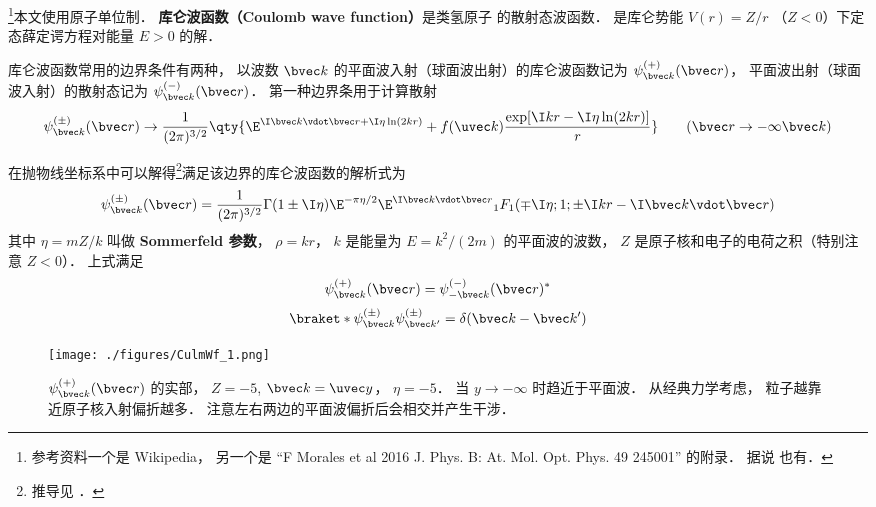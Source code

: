 

\footnote{参考资料一个是 Wikipedia， 另一个是 “F Morales et al 2016 J. Phys. B: At. Mol. Opt. Phys. 49 245001” 的附录． 据说 \cite{Merzbacher} 也有．}本文使用原子单位制． \textbf{库仑波函数（Coulomb wave function）}是类氢原子%
的散射态波函数． %
是库仑势能 $V(r) = Z/r$ （$Z < 0$）下定态薛定谔方程对能量 $E > 0$ 的解．

库仑波函数常用的边界条件有两种， 以波数 $\bvec k$ 的平面波入射（球面波出射）的库仑波函数记为 $\psi_{\bvec k}^{(+)}(\bvec r)$， 平面波出射（球面波入射）的散射态记为 $\psi_{\bvec k}^{(-)}(\bvec r)$． 第一种边界条用于计算散射
\begin{equation}\label{CulmWf_eq4}
\psi_{\bvec k}^{(\pm)}(\bvec r) \to \frac{1}{(2\pi)^{3/2}} \qty{\E^{\I\bvec k\vdot\bvec r + \I\eta\ln (2kr)}
+ f(\uvec k) \frac{\exp[\I kr - \I\eta \ln(2kr)]}{r}}
\qquad
(\bvec r \to -\infty \bvec k)
\end{equation}

在抛物线坐标系中可以解得\footnote{推导见 \cite{Brandsen}．}满足该边界的库仑波函数的解析式为
\begin{equation}\label{CulmWf_eq7}
\psi_{\bvec k}^{(\pm)}(\bvec r) = \frac{1}{(2\pi)^{3/2}} \Gamma(1\pm \I\eta)\E^{-\pi\eta/2} \E^{\I\bvec k\vdot\bvec r} {_1F_1}(\mp\I\eta; 1; \pm\I kr - \I \bvec k\vdot \bvec r)
\end{equation}
其中 $\eta = mZ/k$ 叫做 \textbf{Sommerfeld 参数}， $\rho = kr$， $k$ 是能量为 $E = k^2/(2m)$ 的平面波的波数， $Z$ 是原子核和电子的电荷之积（特别注意 $Z < 0$）． 上式满足
\begin{equation}
\psi_{\bvec k}^{(+)}(\bvec r) = \psi_{-\bvec k}^{(-)}(\bvec r)^*
\end{equation}
\begin{equation}
\braket*{\psi_{\bvec k}^{(\pm)}}{\psi_{\bvec k'}^{(\pm)}} = \delta(\bvec k - \bvec k')
\end{equation}

\begin{figure}[ht]
\centering
\texttt{[image: ./figures/CulmWf\_1.png]} %
\caption{$\psi_{\bvec k}^{(+)}(\bvec r)$ 的实部， $Z = -5$, $\bvec k = \uvec y$， $\eta = -5$． 当 $y \to -\infty$ 时趋近于平面波． 从经典力学考虑， 粒子越靠近原子核入射偏折越多． 注意左右两边的平面波偏折后会相交并产生干涉．} \label{CulmWf_fig2}
\end{figure}

